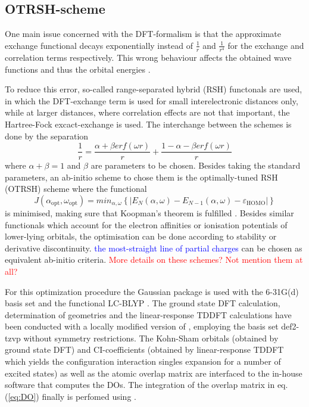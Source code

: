 \subsection{OTRSH-scheme}
One main issue concerned with the DFT-formalism is that the approximate exchange functional decays exponentially instead of $\frac 1r$ and $\frac{1}{r^4}$ for the exchange and correlation terms respectively.
This wrong behaviour affects the obtained wave functions and thus the orbital energies \cite{Bokareva}.

To reduce this error, so-called range-separated hybrid (RSH) functonals are used, in which the DFT-exchange term is used for small interelectronic distances only, while at larger distances, where correlation effects are not that important, the Hartree-Fock excact-exchange is used.
The interchange between the schemes is done by the separation
\begin{equation}
   \frac 1r = \frac{\alpha +\beta erf(\omega r)}{r} +\frac{1-\alpha-\beta erf(\omega r)}{r}
\end{equation}
where $\alpha+\beta=1$ and $\beta$ are parameters to be chosen.
Besides taking the standard parameters, an ab-initio scheme to chose them is the optimally-tuned RSH (OTRSH) scheme where the functional
\begin{equation}\label{eq:J_ao}
   J(\alpha_\text{opt},\omega_\text{opt})=min_{\alpha, \omega} \left\{ |E_N(\alpha,\omega)-E_{N-1}(\alpha,\omega)-\varepsilon_\text{HOMO}| \right\}
\end{equation}
is minimised, making sure that Koopman's theorem is fulfilled \cite{Bokareva}.
Besides similar functionals which account for the electron affinities or ionisation potentials of lower-lying orbitals, the optimisation can be done according to stability or derivative discontinuity.
\textcolor{blue}{the most-straight line of partial charges} can be chosen as equivalent ab-initio criteria.
\textcolor{red}{More details on these schemes? Not mention them at all?}

For this optimization procedure the Gaussian package  \cite{g09} is used with the 6-31G(d) \cite{6-31g,6-31gd} basis set and the functional LC-BLYP \cite{lcblyp}. 
The ground state DFT calculation, determination of geometries and the linear-response TDDFT calculations have been conducted with a locally modified version of  \cite{nwchem}, employing the basis set def2-tzvp \cite{def2tzvp} without symmetry restrictions.
The Kohn-Sham orbitals (obtained by ground state DFT) and CI-coefficients (obtained by linear-response TDDFT which yields the configuration interaction singles expansion for a number of excited states) as well as the atomic overlap matrix are interfaced to the in-house software  \cite{MAgg} that computes the DOs.
The integration of the overlap matrix in eq. (\ref{eq:DO}) finally is perfomed using  \cite{ezDyson}.

